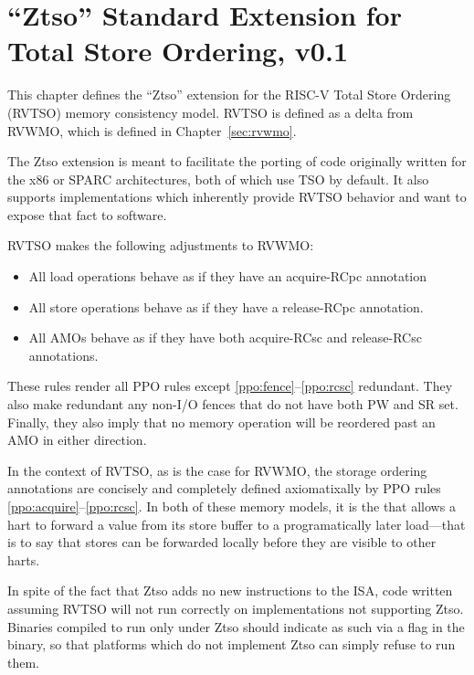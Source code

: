 \chapter{``Ztso'' Standard Extension for Total Store Ordering, v0.1}
\label{sec:ztso}

This chapter defines the ``Ztso'' extension for the RISC-V Total Store Ordering (RVTSO) memory consistency model.
RVTSO is defined as a delta from RVWMO, which is defined in Chapter~\ref{sec:rvwmo}.

\begin{commentary}
  The Ztso extension is meant to facilitate the porting of code originally written for the x86 or SPARC architectures, both of which use TSO by default.
  It also supports implementations which inherently provide RVTSO behavior and want to expose that fact to software.
\end{commentary}

RVTSO makes the following adjustments to RVWMO:

\begin{itemize}
  \item All load operations behave as if they have an acquire-RCpc annotation
  \item All store operations behave as if they have a release-RCpc annotation.
  \item All AMOs behave as if they have both acquire-RCsc and release-RCsc annotations.
\end{itemize}

\begin{commentary}
  These rules render all PPO rules except \ref{ppo:fence}--\ref{ppo:rcsc} redundant.
  They also make redundant any non-I/O fences that do not have both PW and SR set.
  Finally, they also imply that no memory operation will be reordered past an AMO in either direction.
  
  In the context of RVTSO, as is the case for RVWMO, the storage ordering annotations are concisely and completely defined axiomatixally by PPO rules \ref{ppo:acquire}--\ref{ppo:rcsc}. In both of these memory models, it is the  that allows a hart to forward a value from its store buffer to a programatically later load---that is to say that stores can be forwarded locally before they are visible to other harts.
\end{commentary}

In spite of the fact that Ztso adds no new instructions to the ISA, code written assuming RVTSO will not run correctly on implementations not supporting Ztso.
Binaries compiled to run only under Ztso should indicate as such via a flag in the binary, so that platforms which do not implement Ztso can simply refuse to run them.
